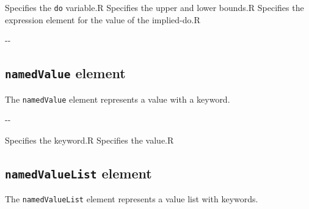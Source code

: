 
\begin{XcodeMLChildElements}
{Specifies the {\tt do} variable.}{R}
{Specifies the upper and lower bounds.}{R}
{Specifies the expression element for the value of the implied-do.}{R}
\end{XcodeMLChildElements}

\begin{XcodeMLAttributes}
\XcodeMLAttrDef{-}{-}
{-}{-}
\end{XcodeMLAttributes}


\subsection{ {\tt namedValue} element}

The {\tt namedValue} element represents a value with a keyword.


\begin{XcodeMLChildElements}
\XcodeMLElementDef{-}
{-}{-}
\end{XcodeMLChildElements}

\begin{XcodeMLAttributes}
{Specifies the keyword.}{R}
{Specifies the value.}{R}
\end{XcodeMLAttributes}


\subsection{ {\tt namedValueList} element}

The {\tt namedValueList} element represents a value list with keywords.


